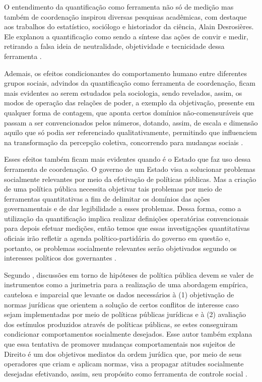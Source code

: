 O entendimento da quantificação como ferramenta não só de medição mas também de coordenação inspirou diversas pesquisas acadêmicas, com destaque aos trabalhos do estatístico, sociólogo e historiador da ciência, Alain Desrosières. Ele explanou a quantificação como sendo a síntese das ações de convir e medir, retirando a falsa ideia de neutralidade, objetividade e tecnicidade dessa ferramenta \cite{desrosieres2013pour} \cite{camargo2021estudos}.

Ademais, os efeitos condicionantes do comportamento humano entre diferentes grupos sociais, advindos da quantificação como ferramenta de coordenação, ficam mais evidentes ao serem estudados pela sociologia, sendo revelados, assim, os modos de operação das relações de poder, a exemplo da objetivação, presente em qualquer forma de contagem, que aponta certos domínios não-comensuráveis que passam a ser convencionados pelos números, dotando, assim, de escala e dimensão aquilo que só podia ser referenciado qualitativamente, permitindo que influenciem na transformação da percepção coletiva, concorrendo para mudanças sociais \cite{camargo2021quantificaccao}.

Esses efeitos também ficam mais evidentes quando é o Estado que faz uso dessa ferramenta de coordenação. O governo de um Estado visa a solucionar problemas socialmente relevantes por meio da efetivação de políticas públicas. Mas a criação de uma política pública necessita objetivar tais problemas por meio de ferramentas quantitativas a fim de delimitar os domínios das ações governamentais e de dar legibilidade a esses problemas. Dessa forma, como a utilização da quantificação implica realizar definições operatórias convencionais para depois efetuar medições, então temos que essas investigações quantitativas oficiais irão refletir a agenda político-partidária do governo em questão e, portanto, os problemas socialmente relevantes serão objetivados segundo os interesses políticos dos governantes \cite{camargo2021estudos}.

Segundo , discussões em torno de hipóteses de política pública devem se valer de instrumentos como a jurimetria para a realização de uma abordagem empírica, cautelosa e imparcial que levante os dados necessários à (1) objetivação de normas jurídicas que orientem a solução de certos conflitos de interesse caso sejam implementadas por meio de políticas públicas jurídicas e à (2) avaliação dos estímulos produzidos através de políticas públicas, se estes conseguiram condicionar comportamentos socialmente desejados. Esse autor também explana que essa tentativa de promover mudanças comportamentais nos sujeitos de Direito é um dos objetivos mediatos da ordem jurídica que, por meio de seus operadores que criam e aplicam normas, visa a propagar atitudes socialmente desejadas efetivando, assim, seu propósito como ferramenta de controle social \cite{nunes2016jurimetria}.

